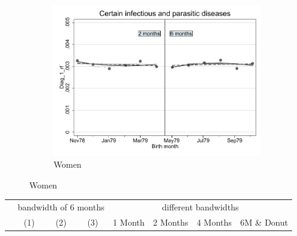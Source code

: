 \documentclass[a4paper ]{article}
\begin{document}
\begin{figure}[h]
\begin{subfigure}[t]{0.31\textwidth}
		\includegraphics[width=0.99\textwidth]{R1_RD_Diag_1_rf_fits}
		\caption{Women}
	\end{subfigure}
\end{figure}

\begin{table}[h]\centering
\def\sym#1{\ifmmode^{#1}\else\(^{#1}\)\fi}
\begin{tabular}{l*{3}{c}|cccc}
\toprule
&\multicolumn{3}{c}{bandwidth of 6 months} & \multicolumn{4}{c}{different bandwidths} \\
 \cmidrule(lr{1em}){2-4} \cmidrule(lr{1em}){5-8}
 &\multicolumn{1}{c}{(1)}&\multicolumn{1}{c}{(2)}&\multicolumn{1}{c}{(3)}& 1 Month & 2 Months & 4 Months & 6M \& Donut \\
\midrule 

\bottomrule
\end{tabular}
\end{table}
\end{document}
